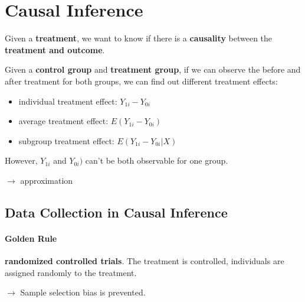 \section{Causal Inference}
Given a \textbf{treatment}, we want to know if there is a \textbf{causality} between the \textbf{treatment and outcome}.

Given a \textbf{control group} and \textbf{treatment group}, if we can observe the before and after treatment for both groups, we can find out different treatment effects:
\begin{itemize}
	\item individual treatment effect: $Y_{1i} - Y_{0i}$
	\item average treatment effect: $E(Y_{1i} - Y_{0i})$
	\item subgroup treatment effect: $E(Y_{1i} - Y_{0i} | X)$
\end{itemize}
However, $Y_{1i}$ and $Y_{0i})$ can't be both observable for one group.

$\rightarrow$ approximation

\subsection{Data Collection in Causal Inference}
\paragraph{Golden Rule} \textbf{randomized controlled trials}. The treatment is controlled, individuals are assigned randomly to the treatment. 

$\rightarrow$ Sample selection bias is prevented.

